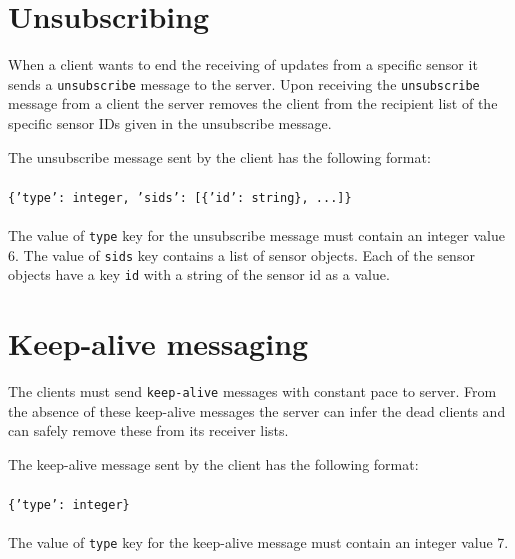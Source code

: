 \section{Unsubscribing}
When a client wants to end the receiving of updates from a specific sensor it
sends a \texttt{unsubscribe} message to the server. Upon receiving the
\texttt{unsubscribe} message from a client the server removes the client from
the recipient list of the specific sensor IDs given in the unsubscribe message.

The unsubscribe message sent by the client has the following format:
\\
\\
\texttt{\{'type': integer, 'sids': [\{'id': string\}, ...]\}}
\\
\\
The value of \texttt{type} key for the unsubscribe message must contain an integer value
6. The value of \texttt{sids} key contains a list of sensor objects. Each of the sensor
objects have a key \texttt{id} with a string of the sensor id as a value.

\section{Keep-alive messaging}
The clients must send \texttt{keep-alive} messages with constant pace to server. From the
absence of these keep-alive messages the server can infer the dead clients and
can safely remove these from its receiver lists.

The keep-alive message sent by the client has the following format:
\\
\\
\texttt{\{'type': integer\}}
\\
\\
The value of \texttt{type} key for the keep-alive message must contain an
integer value 7.




